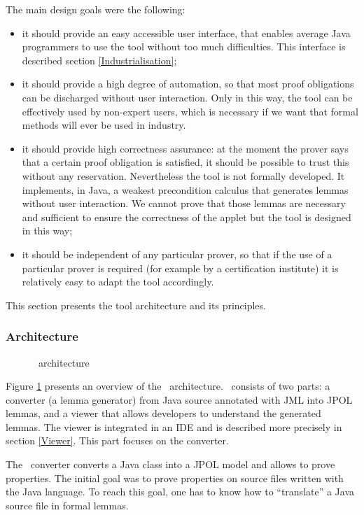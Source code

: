 \label{JavaAppletCorrectnessKit}
 The main design goals were the following:
 \begin{itemize}
 \item it should provide an easy accessible user interface, that enables average Java programmers to use the tool
 without too much difficulties. This interface is
described section \ref{Industrialisation};
 \item it should provide a high degree of automation, so that most proof obligations can be discharged without user
 interaction. Only in this way, the tool can be effectively used by non-expert users, which is necessary if we want that
 formal methods will ever be used in industry. 
 \item it should provide high correctness assurance: at the moment the prover says that a certain proof obligation
is satisfied, it should be possible to trust this without any reservation. Nevertheless
the tool is not formally developed. It implements, in Java, a weakest precondition calculus that
generates lemmas without user interaction. We cannot prove that those lemmas are necessary and sufficient to
ensure the correctness of the applet but the tool is designed in this way;
 \item it should be independent of any particular prover, so that if the use of a particular prover is
 required (for example by a certification institute) it is relatively easy to adapt the tool accordingly.
\end{itemize}


This section presents the tool architecture and its principles.
\subsubsection{Architecture}
\begin{figure}[tp]
 \caption{\sc \JACK\ architecture}
 \label{JACKarchitecture}
\end{figure}
 Figure \ref{JACKarchitecture} presents an overview of the \JACK\
 architecture.  \JACK\ consists of two parts: a converter (a lemma generator) from
 Java source annotated with JML into JPOL lemmas, and a viewer that
 allows developers to understand the generated
 lemmas.  The viewer is integrated in an IDE and is described more precisely in section
 \ref{Viewer}.  This part focuses on the converter.

 The \JACK\ converter converts a Java class into a JPOL model and allows to
 prove properties. 
 The initial goal was to prove properties on source files written with the Java
 language.  To reach this goal, one has to know how to ``translate'' a
 Java source file in formal lemmas.  

